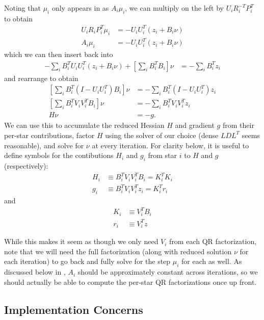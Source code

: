 Noting that $\mu_i$ only appears in  as $A_i\mu_i$, we can multiply  on the left by $U_i R_i^{-T} P_i^T$ to obtain
\begin{align}
    U_i R_i P_i^T \mu_i &= -U_i U_i^T \left(z_i + B_i\nu\right) \\
    A_i \mu_i &= -U_i U_i^T \left(z_i + B_i\nu\right) \label{eq:vp_star_subproblem_qr_2}
\end{align}
which we can then insert back into 
\begin{align}
    -\sum_i B_i^T U_i U_i^T \left(z_i + B_i\nu\right) + \left[\sum_i B_i^T B_i\right]\nu &= -\sum_i B_i^T z_i
\end{align}
and rearrange to obtain
\begin{align}
    \left[\sum_i B_i^T \left(I - U_i U_i^T\right) B_i\right]\nu &=
        -\sum_i B_i^T \left(I - U_i U_i^T\right) z_i \\
    \left[\sum_i B_i^T V_i V_i^T B_i\right]\nu &=
        -\sum_i B_i^T V_i V_i^T z_i \\
    H\nu &= -g.
\end{align}
We can use this to accumulate the reduced Hessian $H$ and gradient $g$ from their per-star contributions, factor $H$ using the solver of our choice (dense $LDL^T$ seems reasonable), and solve for $\nu$ at every iteration.
For clarity below, it is useful to define symbols for the contibutions $H_i$ and $g_i$ from star $i$ to $H$ and $g$ (respectively):
\begin{align}
    H_i &\equiv B_i^T V_i V_i^T B_i = K_i^T K_i \\
    g_i &\equiv B_i^T V_i V_i^T z_i = K_i^T r_i
\end{align}
and
\begin{align}
    K_i &\equiv V_i^T B_i \\
    r_i &\equiv V_i^T z
\end{align}

While this makes it seem as though we only need $V_i$ from each QR factorization, note that we will need the full factorization (along with reduced solution $\nu$ for each iteration) to go back and fully solve for the step $\mu_i$ for each  as well.
As discussed below in , $A_i$ should be approximately constant across iterations, so we should actually be able to compute the per-star QR factorizations once up front.

\subsection{Implementation Concerns}

